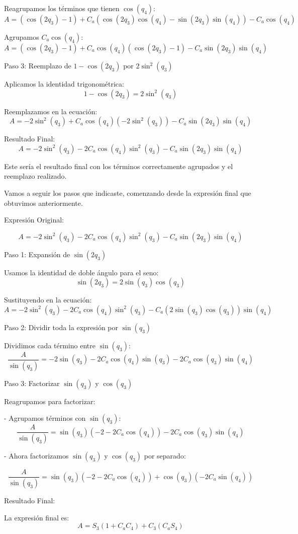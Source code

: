 \documentclass[a4paper,12pt]{article}
\begin{document}
Reagrupamos los términos que tienen \(\cos(q_4)\):
\[
A = (\cos(2q_3) - 1) + C_a (\cos(2q_3)\cos(q_4) - \sin(2q_3)\sin(q_4)) - C_a \cos(q_4)
\]

Agrupamos \(C_a \cos(q_4)\):
\[
A = (\cos(2q_3) - 1) + C_a \cos(q_4)(\cos(2q_3) - 1) - C_a \sin(2q_3)\sin(q_4)
\]

Paso 3: Reemplazo de \(1 - \cos(2q_3)\) por \(2\sin^2(q_3)\)

Aplicamos la identidad trigonométrica:
\[
1 - \cos(2q_3) = 2\sin^2(q_3)
\]

Reemplazamos en la ecuación:
\[
A = -2\sin^2(q_3) + C_a \cos(q_4)(-2\sin^2(q_3)) - C_a \sin(2q_3)\sin(q_4)
\]

Resultado Final:
\[
A = -2\sin^2(q_3) - 2C_a \cos(q_4)\sin^2(q_3) - C_a \sin(2q_3)\sin(q_4)
\]

Este sería el resultado final con los términos correctamente agrupados y el reemplazo realizado.

Vamos a seguir los pasos que indicaste, comenzando desde la expresión final que obtuvimos anteriormente.

Expresión Original:

\[
A = -2\sin^2(q_3) - 2C_a \cos(q_4)\sin^2(q_3) - C_a \sin(2q_3)\sin(q_4)
\]

Paso 1: Expansión de \(\sin(2q_3)\)

Usamos la identidad de doble ángulo para el seno:
\[
\sin(2q_3) = 2\sin(q_3)\cos(q_3)
\]

Sustituyendo en la ecuación:
\[
A = -2\sin^2(q_3) - 2C_a \cos(q_4)\sin^2(q_3) - C_a (2\sin(q_3)\cos(q_3))\sin(q_4)
\]

Paso 2: Dividir toda la expresión por \(\sin(q_3)\)

Dividimos cada término entre \(\sin(q_3)\):
\[
\frac{A}{\sin(q_3)} = -2\sin(q_3) - 2C_a \cos(q_4)\sin(q_3) - 2C_a \cos(q_3)\sin(q_4)
\]

Paso 3: Factorizar \(\sin(q_3)\) y \(\cos(q_3)\)

Reagrupamos para factorizar:

- Agrupamos términos con \(\sin(q_3)\):
\[
\frac{A}{\sin(q_3)} = \sin(q_3)(-2 - 2C_a \cos(q_4)) - 2C_a \cos(q_3)\sin(q_4)
\]

- Ahora factorizamos \(\sin(q_3)\) y \(\cos(q_3)\) por separado:

\[
\frac{A}{\sin(q_3)} = \sin(q_3)(-2 - 2C_a \cos(q_4)) + \cos(q_3)(-2C_a \sin(q_4))
\]

Resultado Final:

La expresión final es:
\[
A = S_3(1 + C_a C_4) + C_3(C_a S_4)
\]
\end{document}
